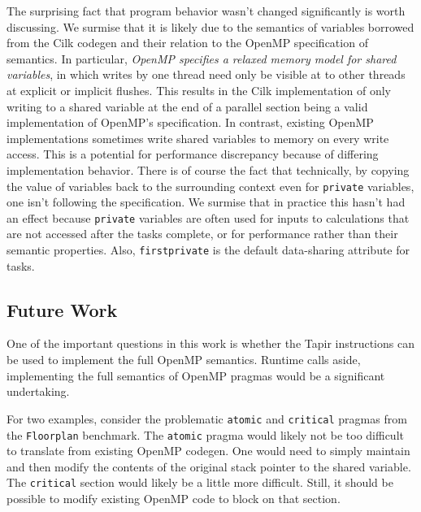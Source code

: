 \documentclass[sigconf]{acmart}
\begin{document}
The surprising fact that program behavior wasn't changed significantly is worth
discussing. We surmise that it is likely due to the semantics of variables
borrowed from the Cilk codegen and their relation to the OpenMP specification
of semantics. In particular, \emph{OpenMP specifies a relaxed memory model
for shared variables}, in which writes by one thread need only be visible at
to other threads at explicit or implicit flushes.
This results in the Cilk implementation of only writing
to a shared variable at the end of a parallel section being a valid
implementation of OpenMP's specification. In contrast, existing OpenMP
implementations sometimes write shared variables to memory on every write
access. This is a potential for performance discrepancy because of differing
implementation behavior.
There is of course the fact that technically, by copying the value of variables
back to the surrounding context even for \texttt{private} variables, one isn't
following the specification. We surmise that in practice this hasn't had an
effect because \texttt{private} variables are often used for inputs to
calculations that are not accessed after the tasks complete, or for performance
rather than their semantic properties.  Also, \texttt{firstprivate} is the
default data-sharing attribute for tasks.

\subsection{Future Work} \label{Sec:Future}

One of the important questions in this work is whether the Tapir instructions
can be used to implement the full OpenMP semantics.
Runtime calls aside, implementing the full semantics of OpenMP pragmas would be
a significant undertaking.

For two examples, consider the problematic \texttt{atomic} and
\texttt{critical} pragmas from the \texttt{Floorplan} benchmark. The
\texttt{atomic} pragma would likely not be too difficult to translate from
existing OpenMP codegen. One would need to simply maintain and then modify the
contents of the original stack pointer to the shared variable. The
\texttt{critical} section would likely be a little more difficult. Still, it
should be possible to modify existing OpenMP code to block on that section.
\end{document}
